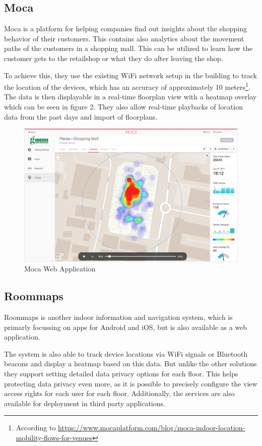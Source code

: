 \subsection{Moca}

Moca is a platform for helping companies find out insights about the shopping behavior of their customers. This contains also analytics about the movement paths of the customers in a shopping mall. 
This can be utilized to learn how the customer gets to the retailshop or what they do after leaving the shop.

To achieve this, they use the existing WiFi network setup in the building to track the location of the devices, which has an accuracy of approximately 10 meters\footnote{According to  \url{https://www.mocaplatform.com/blog/moca-indoor-location-mobility-flows-for-venues}}. The data is then displayable in a real-time floorplan view with a heatmap overlay which can be seen in figure 2. They also allow real-time playbacks of location data from the past days and import of floorplans.

\begin{figure}[!hb]
	\centering
	\includegraphics[width=0.9\linewidth]{images/Moca}
	\caption{Moca Web Application}
	\label{fig:InfsoftApplication}
\end{figure}

\clearpage

\subsection{Roommaps}

Roommaps is another indoor information and navigation system, which is primarly focussing on apps for Android and iOS, but is also available as a web application.

The system is also able to track device locations via WiFi signals or Bluetooth beacons and display a heatmap based on this data. 
But unlike the other solutions they support setting detailed data privacy options for each floor. This helps protecting data privacy even more, as it is possible to precisely configure the view access rights for each user for each floor. Additionally, the services are also available for deployment in third party applications.


